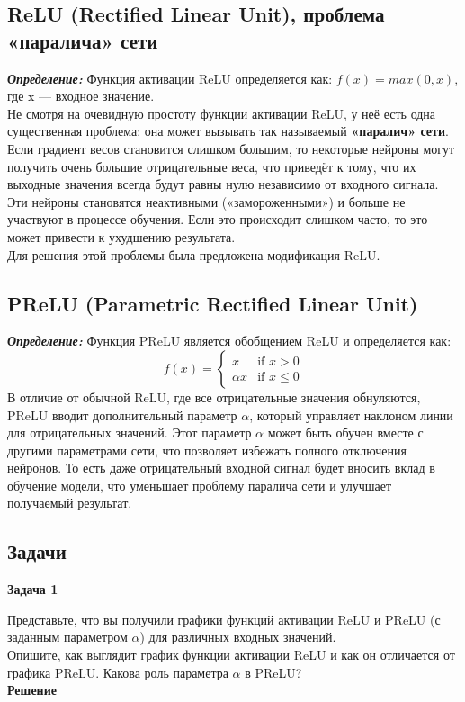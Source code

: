 \subsection{ReLU (Rectified Linear Unit), проблема «паралича» сети}

\textbf{\textit{Определение:}} 
Функция активации ReLU определяется как:
$f(x) = max(0, x)$, где x — входное значение.\\
Не смотря на очевидную простоту функции активации ReLU, у неё есть одна существенная проблема: она может вызывать так называемый \textbf{«паралич» сети}.\\
Если градиент весов становится слишком большим, то некоторые нейроны могут получить очень большие отрицательные веса, что приведёт к тому, что их выходные значения всегда будут равны нулю независимо от входного сигнала. Эти нейроны становятся неактивными («замороженными») и больше не участвуют в процессе обучения. Если это происходит слишком часто, то это может привести к ухудшению результата.\\
Для решения этой проблемы была предложена модификация ReLU.
\subsection{PReLU (Parametric Rectified Linear Unit)}

\textbf{\textit{Определение:}}
Функция PReLU является обобщением ReLU и определяется как:
$$ f(x) = \begin{cases}
x & \text{if } x > 0 \\
\alpha x & \text{if } x \leq 0
\end{cases} $$
В отличие от обычной ReLU, где все отрицательные значения обнуляются, PReLU вводит дополнительный параметр $\alpha$, который управляет наклоном линии для отрицательных значений. Этот параметр $\alpha$ может быть обучен вместе с другими параметрами сети, что позволяет избежать полного отключения нейронов. То есть даже отрицательный входной сигнал будет вносить вклад в обучение модели, что уменьшает проблему паралича сети и улучшает получаемый результат.

\subsection{Задачи}
\textbf{Задача 1}

Представьте, что вы получили графики функций активации ReLU и PReLU (с заданным параметром $\alpha$) для различных входных значений.\\
Опишите, как выглядит график функции активации ReLU и как он отличается от графика PReLU. Какова роль параметра $\alpha$ в PReLU?\\
\textbf{Решение}

